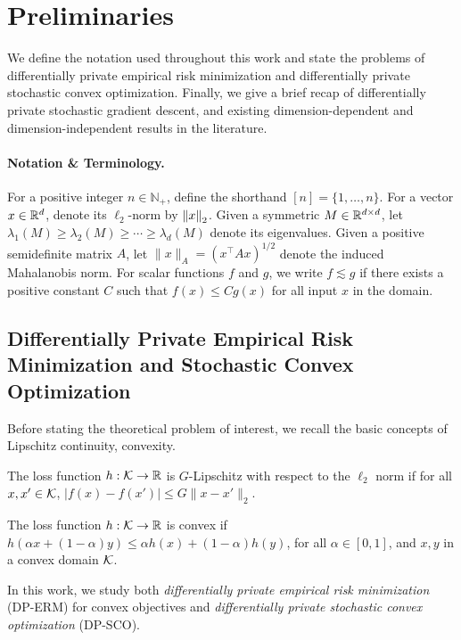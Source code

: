 \section{Preliminaries}
We define the notation used throughout this work and state the problems of differentially private empirical risk minimization and differentially private stochastic convex optimization.
Finally, we give a brief recap of differentially private stochastic gradient descent, and existing dimension-dependent and dimension-independent results in the literature.

\paragraph{Notation \& Terminology.} 
For a positive integer $n \in \mathbb{N}_+$, define the shorthand $[n] = \{1, \dots, n\}$.
For a vector $x \in \mathbb{R}^d$, denote its $\ell_2$-norm by $\left\lVert x\right\rVert_2$.
Given a symmetric $M \in \mathbb{R}^{d \times d}$, let $\lambda_1(M) \ge \lambda_2(M) \ge \cdots \ge \lambda_d(M)$ denote its eigenvalues.
Given a positive semidefinite matrix $A$, let $\| x \|_A = (x^\top A x)^{1/2}$ denote the induced Mahalanobis norm.
For scalar functions $f$ and $g$, we write $f \lesssim g$ if there exists a positive constant $C$ such that $f(x) \leq C g(x)$ for all input $x$ in the domain.

\subsection{Differentially Private Empirical Risk Minimization and Stochastic Convex Optimization}
Before stating the theoretical problem of interest, we recall the basic concepts of Lipschitz continuity, convexity.
\begin{defi}
The loss function $h:\mathcal K\to\mathbb{R}$ is $G$-Lipschitz with respect to the $\ell_2$ norm if for all $x,x' \in \mathcal K$, $|f(x)-f(x')|\leq G\|x-x'\|_2$.
\end{defi}

\begin{defi}[Convexity]
The loss function $h:\mathcal K\to\mathbb{R}$ is convex if $h(\alpha x + (1 - \alpha) y) \le \alpha h(x) + (1 - \alpha) h(y)$, for all $\alpha \in [0, 1]$, and $x, y$ in a convex domain $\mathcal K$.
\end{defi}

In this work, we study both \emph{differentially private empirical risk minimization} (DP-ERM) for convex objectives and \emph{differentially private stochastic convex optimization} (DP-SCO).


